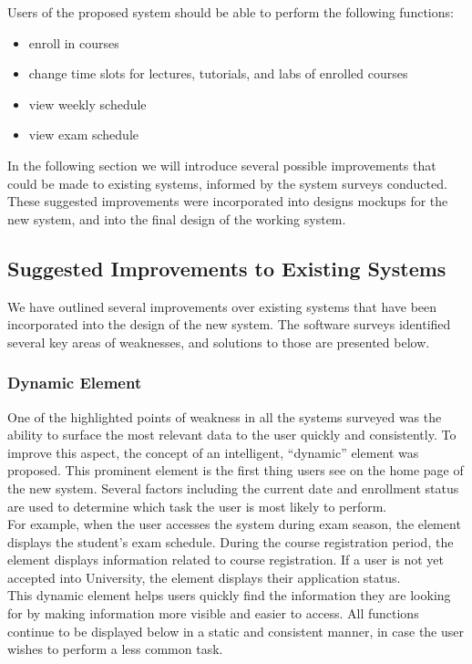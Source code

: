 \documentclass[10pt]{article}
\begin{document}
\begin{multicols}{2}
Users of the proposed system should be able to perform the following functions:
\begin{itemize}
\item enroll in courses
\item change time slots for lectures, tutorials, and labs of enrolled courses
\item view weekly schedule
\item view exam schedule
\end{itemize}

In the following section we will introduce several possible improvements that 
could be made to existing systems, informed by the system surveys conducted. These suggested improvements were incorporated into designs mockups for the new system, and into the final design of the working system.

\subsection*{Suggested Improvements to Existing Systems}
We have outlined several improvements over existing systems that have been incorporated into the design of the new system. The software surveys identified 
several key areas of weaknesses, and solutions to those are presented below.

\subsubsection*{Dynamic Element}
One of the highlighted points of weakness in all the systems surveyed was the 
ability to surface the most relevant data to the user quickly and consistently. 
To improve this aspect, the concept of an intelligent, ``dynamic'' element was 
proposed. This prominent element is the first thing users see on the home page of the new system. Several factors including the current date and enrollment 
status are used to determine which task the user is most likely to perform.\\

For example, when the user accesses the system during exam season, the element 
 displays the student's exam schedule. During the course registration period, 
the element displays information related to course registration. If a user 
is not yet accepted into University, the element displays their application 
status.\\

This dynamic element helps users quickly find the information they are 
looking for by making information more visible and easier to access. All functions continue to be 
displayed below in a static and consistent manner, in case the user wishes to perform a less common task.


\end{multicols}
\end{document}
